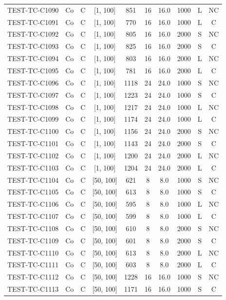 \begin{longtable}{lccccccccc}
TEST-TC-C1090 & Co & C & [1, 100] & 851 & 16 & 16.0 & 1000 & L & NC \\
TEST-TC-C1091 & Co & C & [1, 100] & 770 & 16 & 16.0 & 1000 & L & C \\
TEST-TC-C1092 & Co & C & [1, 100] & 805 & 16 & 16.0 & 2000 & S & NC \\
TEST-TC-C1093 & Co & C & [1, 100] & 825 & 16 & 16.0 & 2000 & S & C \\
TEST-TC-C1094 & Co & C & [1, 100] & 803 & 16 & 16.0 & 2000 & L & NC \\
TEST-TC-C1095 & Co & C & [1, 100] & 781 & 16 & 16.0 & 2000 & L & C \\
TEST-TC-C1096 & Co & C & [1, 100] & 1118 & 24 & 24.0 & 1000 & S & NC \\
TEST-TC-C1097 & Co & C & [1, 100] & 1223 & 24 & 24.0 & 1000 & S & C \\
TEST-TC-C1098 & Co & C & [1, 100] & 1217 & 24 & 24.0 & 1000 & L & NC \\
TEST-TC-C1099 & Co & C & [1, 100] & 1174 & 24 & 24.0 & 1000 & L & C \\
TEST-TC-C1100 & Co & C & [1, 100] & 1156 & 24 & 24.0 & 2000 & S & NC \\
TEST-TC-C1101 & Co & C & [1, 100] & 1143 & 24 & 24.0 & 2000 & S & C \\
TEST-TC-C1102 & Co & C & [1, 100] & 1200 & 24 & 24.0 & 2000 & L & NC \\
TEST-TC-C1103 & Co & C & [1, 100] & 1204 & 24 & 24.0 & 2000 & L & C \\
TEST-TC-C1104 & Co & C & [50, 100] & 621 & 8 & 8.0 & 1000 & S & NC \\
TEST-TC-C1105 & Co & C & [50, 100] & 613 & 8 & 8.0 & 1000 & S & C \\
TEST-TC-C1106 & Co & C & [50, 100] & 595 & 8 & 8.0 & 1000 & L & NC \\
TEST-TC-C1107 & Co & C & [50, 100] & 599 & 8 & 8.0 & 1000 & L & C \\
TEST-TC-C1108 & Co & C & [50, 100] & 610 & 8 & 8.0 & 2000 & S & NC \\
TEST-TC-C1109 & Co & C & [50, 100] & 601 & 8 & 8.0 & 2000 & S & C \\
TEST-TC-C1110 & Co & C & [50, 100] & 613 & 8 & 8.0 & 2000 & L & NC \\
TEST-TC-C1111 & Co & C & [50, 100] & 603 & 8 & 8.0 & 2000 & L & C \\
TEST-TC-C1112 & Co & C & [50, 100] & 1228 & 16 & 16.0 & 1000 & S & NC \\
TEST-TC-C1113 & Co & C & [50, 100] & 1171 & 16 & 16.0 & 1000 & S & C \\

\end{longtable}

